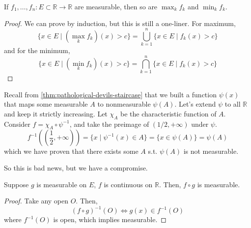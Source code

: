   \begin{theorem}
    If $f_1, \ldots, f_n: E \subset \mathbb{R} \to \mathbb{R}$ are measurable, then so are $\max_k f_k$ and $\min_k f_k$. 
  \end{theorem}
  \begin{proof}
    We can prove by induction, but this is still a one-liner. For maximum, 
    \begin{equation}
      \{x \in E \mid (\max_k{f_k})(x) > c \} = \bigcup_{k=1}^n \{x \in E \mid f_k (x) > c\} 
    \end{equation}
    and for the minimum, 
    \begin{equation}
      \{x \in E \mid (\min_k{f_k})(x) > c \} = \bigcap_{k=1}^n \{x \in E \mid f_k (x) > c\} 
    \end{equation}
  \end{proof} 

  \begin{example}
    Recall from \ref{thm:pathological-devils-staircase} that we built a function $\psi(x)$ that maps some measurable $A$ to nonmeasurable $\psi(A)$. Let's extend $\psi$ to all $\mathbb{R}$ and keep it strictly increasing. Let $\chi_A$ be the characteristic function of $A$. Consider $f = \chi_A \circ \psi^{-1}$, and take the preimage of $(1/2, +\infty)$ under $\psi$. 
    \begin{equation}
      f^{-1} ((\frac{1}{2}, +\infty)) = \{x \mid \psi^{-1} (x) \in A \}  = \{x \in \psi(A)\} = \psi(A)
    \end{equation}
    which we have proven  that there exists some $A$ s.t. $\psi(A)$ is not measurable. 
  \end{example}

  So this is bad news, but we have a compromise. 

  \begin{theorem}
    Suppose $g$ is measurable on $E$, $f$ is continuous on $\mathbb{R}$. Then, $f \circ g$ is measurable. 
  \end{theorem}
  \begin{proof}
    Take any open $O$. Then, 
    \begin{equation}
      (f \circ g)^{-1} (O) \iff g(x) \in f^{-1} (O) 
    \end{equation}
    where $f^{-1} (O)$ is open, which implies measurable. 
  \end{proof}

